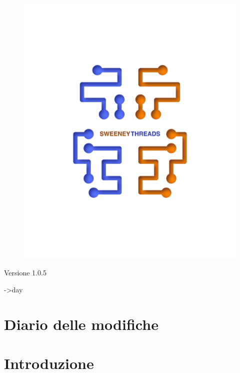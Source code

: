 \documentclass[a4paper]{article}
\begin{document}
\begin{titlepage}
		\begin{figure}[H]
			\centering
			\includegraphics[scale=0.8]{sweeney.png}
		\end{figure}
		\begin{center}
			Versione 1.0.5
		\end{center}
		{\large ->day}\\[3cm] 
		\vfill  
	\end{titlepage}
	
	
	\tableofcontents
	
	\newpage 
	\section*{Diario delle modifiche}

	\newpage \section{Introduzione}
\end{document}
